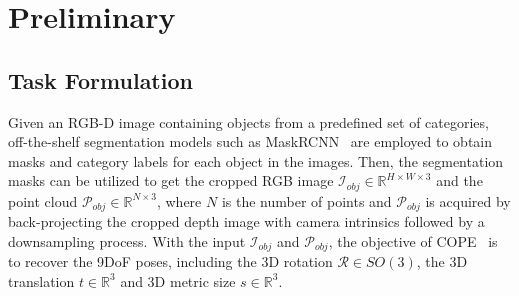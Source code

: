 \section{Preliminary}
\label{sec:Preliminary}
\subsection{Task Formulation}
\label{sec:task_formulation}
Given an RGB-D image containing objects from a predefined set of categories, off-the-shelf segmentation models such as MaskRCNN~\cite{he2017mask} are employed to obtain masks and category labels for each object in the images. Then, the segmentation masks can be utilized to get the cropped RGB image $\mathcal{I}_{obj} \in \mathbb{R}^{H \times W \times 3}$ and the point cloud $\mathcal{P}_{obj} \in \mathbb{R}^{N \times 3}$, where $N$ is the number of points and $\mathcal{P}_{obj}$ is acquired by back-projecting the cropped depth image with camera intrinsics followed by a downsampling process. With the input $\mathcal{I}_{obj}$ and $\mathcal{P}_{obj}$, the objective of COPE~\cite{wang2019normalized} is to recover the 9DoF poses, including the 3D rotation $\mathcal{R} \in SO(3)$, the 3D translation $t \in \mathbb{R}^3$ and 3D metric size $s \in \mathbb{R}^3$.


